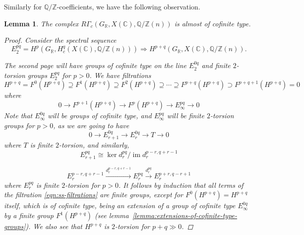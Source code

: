 \documentclass[draft,leqno,12pt]{article}
\theoremstyle{plain}
\newtheorem{lemma}[theorem]{\indent\sc Lemma}
\theoremstyle{definition}
\DeclareMathOperator{\im}{im}
\newcommand{\ZZ}{\mathbb{Z}}
\newcommand{\QQ}{\mathbb{Q}}
\newcommand{\RR}{\mathbb{R}}
\newcommand{\CC}{\mathbb{C}}
\begin{document}
Similarly for $\QQ/\ZZ$-coefficients, we have the following observation.

\begin{lemma}
  \label{lemma:RGammac(GR,X(C),Q/Z(n))-almost-cofinite-type}
  The complex $R\Gamma_c (G_\RR, X (\CC), \QQ/\ZZ (n))$
  is almost of cofinite type.

  \begin{proof}
    Consider the spectral sequence
    \[ E_2^{pq} = H^p (G_\RR, H^q_c (X (\CC), \QQ/\ZZ (n)))
    \Longrightarrow
    H^{p+q} (G_\RR, X (\CC), \QQ/\ZZ (n)). \]

    The second page will have groups of cofinite type on the line $E_2^{0q}$ and
    finite $2$-torsion groups $E_2^{pq}$ for $p > 0$. We have filtrations
    \begin{equation}
      \label{eqn:ss-filtrations}
      H^{p+q} = F^0 (H^{p+q}) \supseteq
      F^1 (H^{p+q}) \supseteq
      F^2 (H^{p+q}) \supseteq \cdots \supseteq
      F^{p+q} (H^{p+q}) \supset F^{p+q+1} (H^{p+q}) = 0
    \end{equation}
    where
    $$0 \to F^{p+1} (H^{p+q}) \to F^p (H^{p+q}) \to E_\infty^{pq} \to 0$$
    Note that $E^{0q}_\infty$ will be groups of cofinite type, and
    $E^{pq}_\infty$ will be finite $2$-torsion groups for $p > 0$, as we are
    going to have
    $$0 \to E_{r+1}^{0q} \to E_r^{0q} \to T \to 0$$
    where $T$ is finite $2$-torsion, and similarly,
    $$E_{r+1}^{pq} \cong \ker d_r^{pq} / \im d_r^{p-r,q+r-1}$$

    \[ E_r^{p-r,q+r-1} \xrightarrow{d_r^{p-r,q+r-1}}
    E_r^{pq} \xrightarrow{d_r^{pq}} E_r^{p+r,q-r+1} \]
    where $E_r^{pq}$ is finite $2$-torsion for $p > 0$. It follows by induction
    that all terms of the filtration \eqref{eqn:ss-filtrations} are finite
    groups, except for $F^0 (H^{p+q}) = H^{p+q}$ itself, which is of cofinite
    type, being an extension of a group of cofinite type $E_\infty^{0q}$ by a
    finite group $F^1 (H^{p+q})$
    (see lemma~\ref{lemma:extensions-of-cofinite-type-groups}). We also see that
    $H^{p+q}$ is $2$-torsion for $p+q \gg 0$.
  \end{proof}
\end{lemma}
\end{document}

